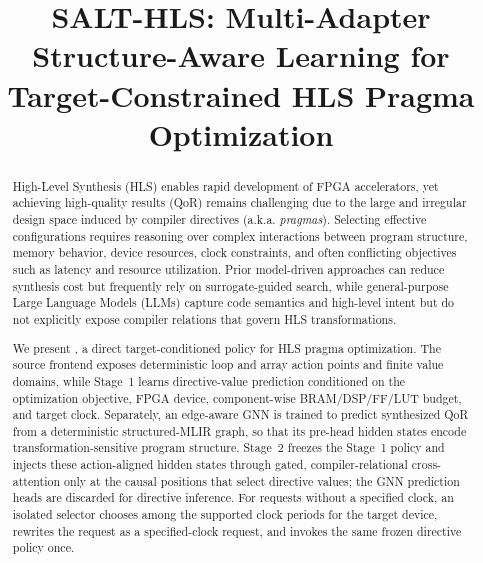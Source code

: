 \documentclass[sigplan,anonymous,review,nonacm]{acmart}
\begin{document}
\title{SALT-HLS: Multi-Adapter Structure-Aware Learning for Target-Constrained HLS Pragma Optimization}

\begin{abstract}
High-Level Synthesis (HLS) enables rapid development of FPGA accelerators, yet achieving high-quality results (QoR) remains challenging due to the large and irregular design space induced by compiler directives (a.k.a. \textit{pragmas}). Selecting effective configurations requires reasoning over complex interactions between program structure, memory behavior, device resources, clock constraints, and often conflicting objectives such as latency and resource utilization. Prior model-driven approaches can reduce synthesis cost but frequently rely on surrogate-guided search, while general-purpose Large Language Models (LLMs) capture code semantics and high-level intent but do not explicitly expose compiler relations that govern HLS transformations.

We present \framework, a direct target-conditioned policy for HLS pragma optimization. The source frontend exposes deterministic loop and array action points and finite value domains, while Stage~1 learns directive-value prediction conditioned on the optimization objective, FPGA device, component-wise BRAM/DSP/FF/LUT budget, and target clock. Separately, an edge-aware GNN is trained to predict synthesized QoR from a deterministic structured-MLIR graph, so that its pre-head hidden states encode transformation-sensitive program structure. Stage~2 freezes the Stage~1 policy and injects these action-aligned hidden states through gated, compiler-relational cross-attention only at the causal positions that select directive values; the GNN prediction heads are discarded for directive inference. For requests without a specified clock, an isolated selector chooses among the supported clock periods for the target device, rewrites the request as a specified-clock request, and invokes the same frozen directive policy once.

\end{abstract}
\end{document}
